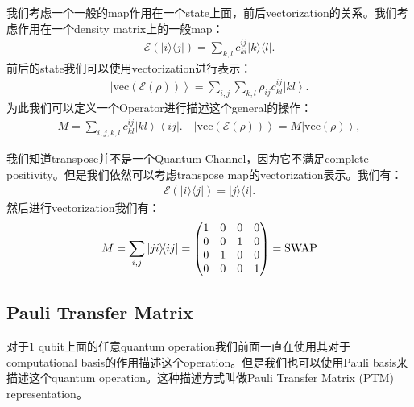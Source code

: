 

我们考虑一个一般的map作用在一个state上面，前后vectorization的关系。我们考虑作用在一个density matrix上的一般map：
\begin{align}
  \mathcal{E}\left(\left|i\rangle\langle j\right|\right)=\sum_{k,l}c_{kl}^{ij}\left|k\rangle\langle l\right|.
\end{align}
前后的state我们可以使用vectorization进行表示：
\begin{align}
  \left|\mathrm{vec}(\mathcal{E}(\rho))\right\rangle=\sum_{i,j}\sum_{k,l}\rho_{ij}c_{kl}^{ij}\left|k\left.l\right\rangle\right..
\end{align}
为此我们可以定义一个Operator进行描述这个general的操作：
\begin{align}
  M=\sum_{i,j,k,l}c_{kl}^{ij}\left|k\left.l\right\rangle\left\langle i\left.j\right|\right..\right. \quad \left|\mathrm{vec}(\mathcal{E}(\rho))\right\rangle=M\left|\mathrm{vec}(\rho)\right\rangle,
\end{align}



\bigskip
{}

我们知道transpose并不是一个Quantum Channel，因为它不满足complete positivity。但是我们依然可以考虑transpose map的vectorization表示。我们有：
\begin{align}
  \mathcal{E}{\left(\left|i\rangle\langle j\right|\right)}=\left|j\rangle\langle i\right|.
\end{align}
然后进行vectorization我们有：
\begin{align}
  M=\sum_{i,j}\left| ji \middle\rangle\!\middle\langle ij \right|=\begin{pmatrix}1&0&0&0\\0&0&1&0\\0&1&0&0\\0&0&0&1\end{pmatrix}=\mathrm{SWAP}
\end{align}

\subsection{Pauli Transfer Matrix}

对于1 qubit上面的任意quantum operation我们前面一直在使用其对于computational basis的作用描述这个operation。但是我们也可以使用Pauli basis来描述这个quantum operation。这种描述方式叫做Pauli Transfer Matrix (PTM) representation。

